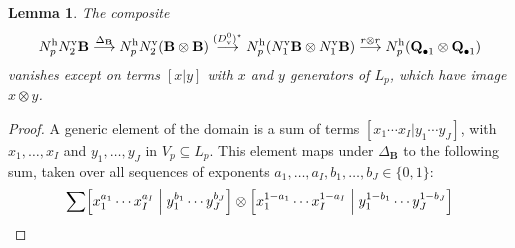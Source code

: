 \documentclass[11pt]{amsart} \renewcommand{\baselinestretch}{1.2}
\theoremstyle{plain}
\newtheorem{lem}[thm]{Lemma}
\numberwithin{equation}{section} %
\theoremstyle{plain}
\newtheorem{lem}[thm]{Lemma}
\numberwithin{equation}{chapter} %
\renewcommand{\to}{\longrightarrow}
\newcommand{\DeltatubfD}{\Delta_{\mathrm{\textbf{B}}}}
\newcommand{\uver}{^\mathrm{v}}
\newcommand{\uhor}{^\mathrm{h}}
\newcommand{\dver}{_\mathrm{v}}
\begin{document}
\begin{appendices}

\begin{lem}
\label{firstCompositeLemma}
The composite
\[N\uhor_{p}N\uver_2\textup{\textbf{B}}\overset{\DeltatubfD}{\to} N\uhor_{p}N\uver_2(\textup{\textbf{B}}\otimes\textup{\textbf{B}}) \overset{(D\dver^0)^\star}{\to} N\uhor_{p}(N\uver_1\textup{\textbf{B}}\otimes N\uver_1\textup{\textbf{B}})\overset{r\otimes r}{\to}N\uhor_p(\textup{\textbf{Q}}_{\bullet 1}\otimes \textup{\textbf{Q}}_{\bullet 1})\]
vanishes except on terms $[x|y]$ with $x$ and $y$ generators of $ L_p$, which have image $x\otimes y$.
\end{lem}
\begin{proof}
A generic element of the domain is a sum of terms $[x_1\cdots x_I|y_1\cdots y_J]$, with $x_1,\ldots,x_I$ and $y_1,\ldots,y_J$ in $V_p\subseteq L_p$. This element maps under $\DeltatubfD$ to the following sum, taken over all sequences of exponents $a_1,\ldots,a_I,b_1,\ldots,b_J\in\{0,1\}$:
\[\sum%
\textstyle\Bigl[x_1^{a_1}\cdots x_I^{a_I}\Bigm|y_1^{b_1}\cdots y_J^{b_J}\Bigr]\otimes
\Bigl[x_1^{1-a_1}\cdots x_I^{1-a_I}\Bigm|y_1^{1-b_1}\cdots y_J^{1-b_J}\Bigr]
\]
\end{proof}
\end{appendices}
\end{document}

